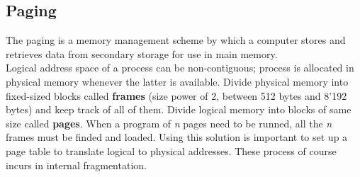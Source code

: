 \documentclass[12pt]{article}
\begin{document}
\subsection{Paging}
The paging is a memory management scheme by which a computer stores and retrieves data from secondary storage for use in main memory.\\
Logical address space of a process can be non-contiguous; process is allocated in physical memory whenever the latter is available. Divide physical memory into fixed-sized blocks called \textbf{frames} (size power of 2, between 512 bytes and 8'192 bytes) and keep track of all of them. Divide logical memory into blocks of same size called \textbf{pages}. When a program of \textit{n} pages need to be runned, all the \textit{n} frames must be finded and loaded. Using this solution is important to set up a page table to translate logical to physical addresses. These process of course incurs in internal fragmentation.\\
\end{document}
